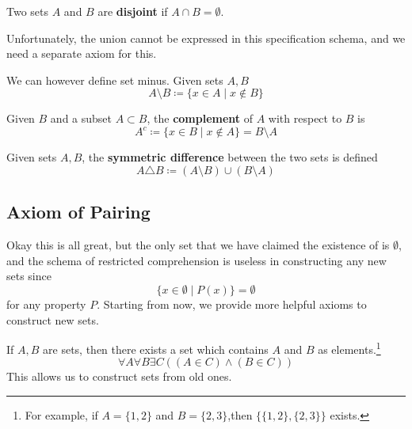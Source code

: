   \begin{definition}
    Two sets $A$ and $B$ are \textbf{disjoint} if $A \cap B = \emptyset$. 
  \end{definition}

  Unfortunately, the union cannot be expressed in this specification schema, and we need a separate axiom for this. 

  \begin{definition}
    We can however define set minus. Given sets $A, B$
    \begin{equation}
      A \setminus B \coloneqq \{ x \in A \mid x \not\in B \}
    \end{equation}
  \end{definition}

  \begin{definition}
    Given $B$ and a subset $A \subset B$, the \textbf{complement} of $A$ with respect to $B$ is 
    \begin{equation}
      A^c \coloneqq \{ x \in B \mid x \not\in A \} = B \setminus A
    \end{equation}
  \end{definition}  

  \begin{definition}
    Given sets $A, B$, the \textbf{symmetric difference} between the two sets is defined 
    \begin{equation}
      A \triangle B \coloneqq (A \setminus B) \cup (B \setminus A)
    \end{equation}
  \end{definition} 

\subsection{Axiom of Pairing}

  Okay this is all great, but the only set that we have claimed the existence of is $\emptyset$, and the schema of restricted comprehension is useless in constructing any new sets since 
  \begin{equation}
    \{x \in \emptyset \mid P(x) \} = \emptyset
  \end{equation}
  for any property $P$. Starting from now, we provide more helpful axioms to construct new sets. 

  \begin{axiom}
    If $A, B$ are sets, then there exists a set which contains $A$ and $B$ as elements.\footnote{For example, if $A = \{1, 2\}$ and $B = \{2, 3\}$,then $\{\{1, 2\}, \{2, 3\}\}$ exists.}
    \begin{equation}
      \forall A \forall B \exists C((A \in C) \land (B \in C))
    \end{equation}
    This allows us to construct sets from old ones. 
  \end{axiom}

